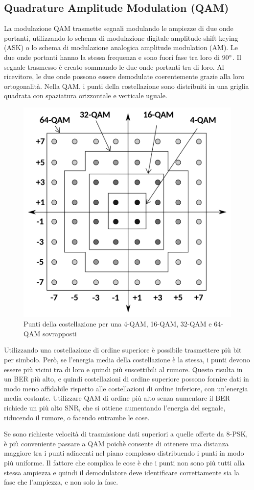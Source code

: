 \subsection{Quadrature Amplitude Modulation (QAM)}
La modulazione \ac{QAM} trasmette segnali modulando le ampiezze di due onde portanti, utilizzando lo schema di modulazione digitale amplitude-shift keying (ASK) o lo schema di modulazione analogica amplitude modulation (AM). Le due onde portanti hanno la stessa frequenza e sono fuori fase tra loro di $90\degree$.
Il segnale trasmesso è creato sommando le due onde portanti tra di loro.
Al ricevitore, le due onde possono essere demodulate coerentemente grazie alla loro ortogonalità.
Nella \ac{QAM}, i punti della costellazione sono distribuiti in una griglia quadrata con spaziatura orizzontale e verticale uguale.

\begin{figure}[htbp]
  \centering
  \includegraphics[width=0.4\linewidth]{./res/img/qam.png}
  \caption{Punti della costellazione per una 4-\ac{QAM}, 16-\ac{QAM}, 32-\ac{QAM} e 64-\ac{QAM} sovrapposti}
  \label{fig:qam-diagram}
\end{figure}

Utilizzando una costellazione di ordine superiore è possibile trasmettere più bit per simbolo.
Però, se l'energia media della costellazione è la stessa, i punti devono essere più vicini tra di loro e quindi più suscettibili al rumore.
Questo risulta in un \ac{BER} più alto, e quindi costellazioni di ordine superiore possono fornire dati in modo meno affidabile rispetto alle costellazioni di ordine inferiore, con un'energia media costante.
Utilizzare \ac{QAM} di ordine più alto senza aumentare il \ac{BER} richiede un più alto \ac{SNR}, che si ottiene aumentando l'energia del segnale, riducendo il rumore, o facendo entrambe le cose.

Se sono richieste velocità di trasmissione dati superiori a quelle offerte da 8-\ac{PSK}, è più conveniente passare a \ac{QAM} poichè consente di ottenere una distanza maggiore tra i punti adiacenti nel piano complesso distribuendo i punti in modo più uniforme.
Il fattore che complica le cose è che i punti non sono più tutti alla stessa ampiezza e quindi il demodulatore deve identificare correttamente sia la fase che l'ampiezza, e non solo la fase.

